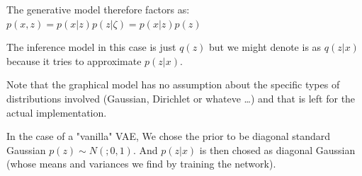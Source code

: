 \documentclass[11pt, a4paper]{report}
\theoremstyle{plain}
\theoremstyle{definition}
\theoremstyle{remark}
\begin{document}
The generative model therefore factors as: $p(x,z) = p(x|z)p(z|\zeta) =
p(x|z)p(z)$

The inference model in this case is just $q(z)$ but we might denote is as
$q(z|x)$ because it tries to approximate $p(z|x)$.

Note that the graphical model has no assumption about the specific types of
distributions involved (Gaussian, Dirichlet or whateve \dots) and that is left
for the actual implementation.

In the case of a "vanilla" VAE, We chose the prior to be diagonal standard Gaussian
$p(z) \sim N(;0,1)$. And $p(z | x)$ is then chosed as diagonal Gaussian (whose
means and variances we find by training the network).

\begin{figure}
\centering
\begin{subfigure}[b]{0.2\textwidth}

\end{subfigure}
\end{figure}
\end{document}
